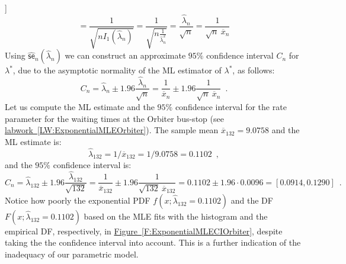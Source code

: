 \begin{example}[[Fisher Information of the $\exponential$ Experiment]]
\[= \frac{1}{\sqrt{n I_1(\widehat{\lambda}_n)}} 
= \frac{1}{\sqrt{n \frac{1}{\widehat{\lambda}_n^2} }}
= \frac{\widehat{\lambda}_n}{\sqrt{n}}
= \frac{1}{\sqrt{n} \ \overline{x}_n}
\]
Using $\widehat{\mathsf{se}}_n(\widehat{\lambda}_n)$ we can construct an approximate $95\%$ confidence interval $C_n$ for $\lambda^*$, due to the asymptotic normality of the ML estimator of $\lambda^*$, as follows:
\[
C_n 
= \widehat{\lambda}_n \pm 1.96 \frac{\widehat{\lambda}_n}{\sqrt{n}}
= \frac{1}{\overline{x}_n} \pm 1.96 \frac{1}{\sqrt{n} \ \overline{x}_n} \enspace .
\]
Let us compute the ML estimate and the $95\%$ confidence interval for the rate parameter for the waiting times at the Orbiter bus-stop (see \hyperref[LW:ExponentialMLEOrbiter]{labwork~\ref*{LW:ExponentialMLEOrbiter}}).  The sample mean $\overline{x}_{132}=9.0758$ and the ML estimate is:
$$\widehat{\lambda}_{132}=1/\overline{x}_{132}=1/9.0758=0.1102 \enspace ,$$
and the $95\%$ confidence interval is:  
\[
C_n 
= \widehat{\lambda}_{132} \pm 1.96 \frac{\widehat{\lambda}_{132}}{\sqrt{132}}
= \frac{1}{\overline{x}_{132}} \pm 1.96 \frac{1}{\sqrt{132} \ \overline{x}_{132}} = 0.1102 \pm 1.96 \cdot 0.0096 = [0.0914, 0.1290] \enspace .
\]
Notice how poorly the exponential PDF $f(x;\widehat{\lambda}_{132}=0.1102)$ and the DF $F(x;\widehat{\lambda}_{132}=0.1102)$ based on the MLE fits with the histogram and the empirical DF, respectively, in \hyperref[F:ExponentialMLECIOrbiter]{Figure~\ref*{F:ExponentialMLECIOrbiter}}, despite  taking the the confidence interval into account.  This is a further indication of the inadequacy of our parametric model.
\end{example}

